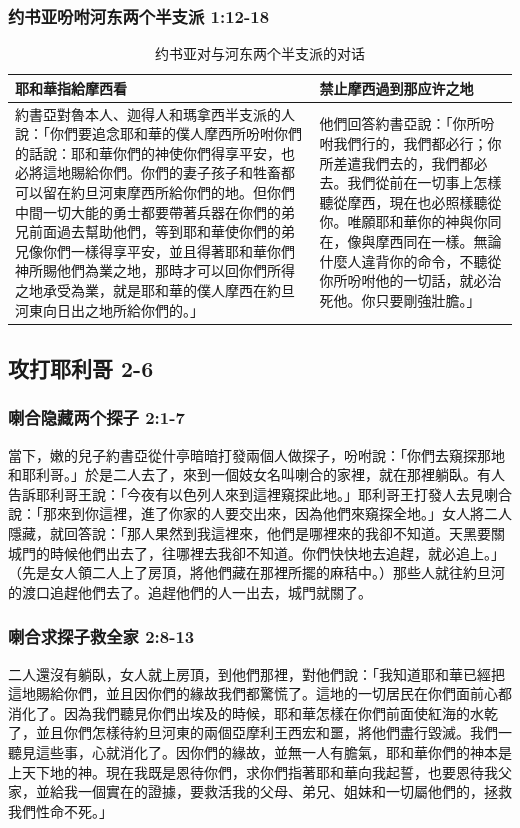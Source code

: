 \subsubsection{约书亚吩咐河东两个半支派 1:12-18 }
\begin{table}[H]
\begin{tabular}{ p{10.8cm}|p{6.5cm}} \toprule
耶和華指給摩西看&禁止摩西過到那应许之地          \\\hline
約書亞對魯本人、迦得人和瑪拿西半支派的人說：「你們要追念耶和華的僕人摩西所吩咐你們的話說：耶和華你們的神使你們得享平安，也必將這地賜給你們。你們的妻子孩子和牲畜都可以留在約旦河東摩西所給你們的地。但你們中間一切大能的勇士都要帶著兵器在你們的弟兄前面過去幫助他們，等到耶和華使你們的弟兄像你們一樣得享平安，並且得著耶和華你們神所賜他們為業之地，那時才可以回你們所得之地承受為業，就是耶和華的僕人摩西在約旦河東向日出之地所給你們的。」&他們回答約書亞說：「你所吩咐我們行的，我們都必行；你所差遣我們去的，我們都必去。我們從前在一切事上怎樣聽從摩西，現在也必照樣聽從你。唯願耶和華你的神與你同在，像與摩西同在一樣。無論什麼人違背你的命令，不聽從你所吩咐他的一切話，就必治死他。你只要剛強壯膽。」\\\hline
\bottomrule
\end{tabular}
\caption{约书亚对与河东两个半支派的对话}
\label{table:sci}
\end{table}



\subsection{攻打耶利哥 2-6 }

\subsubsection{喇合隐藏两个探子 2:1-7}
當下，嫩的兒子約書亞從什亭暗暗打發兩個人做探子，吩咐說：「你們去窺探那地和耶利哥。」於是二人去了，來到一個妓女名叫喇合的家裡，就在那裡躺臥。有人告訴耶利哥王說：「今夜有以色列人來到這裡窺探此地。」耶利哥王打發人去見喇合說：「那來到你這裡，進了你家的人要交出來，因為他們來窺探全地。」女人將二人隱藏，就回答說：「那人果然到我這裡來，他們是哪裡來的我卻不知道。天黑要關城門的時候他們出去了，往哪裡去我卻不知道。你們快快地去追趕，就必追上。」（先是女人領二人上了房頂，將他們藏在那裡所擺的麻秸中。）那些人就往約旦河的渡口追趕他們去了。追趕他們的人一出去，城門就關了。

\subsubsection{喇合求探子救全家 2:8-13}
二人還沒有躺臥，女人就上房頂，到他們那裡，對他們說：「我知道耶和華已經把這地賜給你們，並且因你們的緣故我們都驚慌了。這地的一切居民在你們面前心都消化了。因為我們聽見你們出埃及的時候，耶和華怎樣在你們前面使紅海的水乾了，並且你們怎樣待約旦河東的兩個亞摩利王西宏和噩，將他們盡行毀滅。我們一聽見這些事，心就消化了。因你們的緣故，並無一人有膽氣，耶和華你們的神本是上天下地的神。現在我既是恩待你們，求你們指著耶和華向我起誓，也要恩待我父家，並給我一個實在的證據，要救活我的父母、弟兄、姐妹和一切屬他們的，拯救我們性命不死。」 

